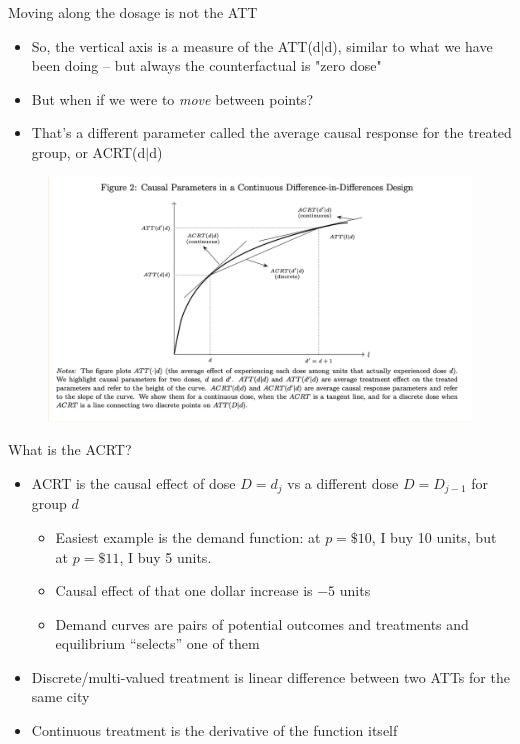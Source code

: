 \documentclass{beamer}
\begin{document}
\begin{frame}{Moving along the dosage is not the ATT}

\begin{itemize}
\item So, the vertical axis is a measure of the ATT(d|d), similar to what we have been doing -- but always the counterfactual is "zero dose"
\item But when if we were to \emph{move} between points?  
\item That's a different parameter called the average causal response for the treated group, or ACRT(d$|$d)
\end{itemize}

\end{frame}
\begin{frame}


\begin{figure}
\begin{center}
             \includegraphics[scale=0.45]{./lecture_includes/continuous1.png}
\end{center}
\end{figure}

\end{frame}

\begin{frame}{What is the ACRT?}

\begin{itemize}
\item ACRT is the causal effect of dose $D=d_j$ vs a different dose $D=D_{j-1}$ for group $d$
	\begin{itemize}
	\item Easiest example is the demand function: at $p=\$10$, I buy 10 units, but at $p=\$11$, I buy 5 units.  
	\item Causal effect of that one dollar increase is $-5$ units
	\item Demand curves are pairs of potential outcomes and treatments and equilibrium ``selects'' one of them
	\end{itemize}
\item Discrete/multi-valued treatment is linear difference between two ATTs for the same city
\item Continuous treatment is the derivative of the function itself
\end{itemize}

\end{frame}
\end{document}

